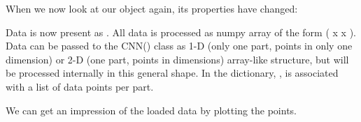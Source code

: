 \documentclass[letterpaper,10pt,english]{sphinxmanual}
\begin{document}
When we now look at our object again, its properties have changed:

%
\begin{sphinxVerbatim}[commandchars=\\\{\}]
\end{sphinxVerbatim}

Data is now present as . All data is processed as numpy array of
the form ( x  x ). Data can be passed to the
CNN() class as 1-D (only one part, points in only one dimension) or 2-D
(one part, points in  dimensions) array-like structure, but will be
processed internally in this general shape. In the  dictionary,
,  is associated with a list of data
points per part.

We can get an impression of the loaded data by plotting the points.

%
\begin{sphinxVerbatim}[commandchars=\\\{\}]
\end{sphinxVerbatim}

\begin{figure}[htbp]
\centering

\noindent{}
\end{figure}
\end{document}
